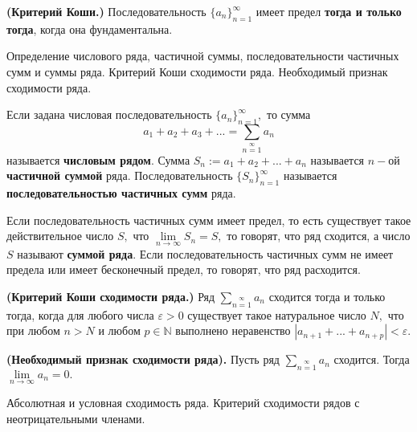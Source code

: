 \begin{theorem} \textbf{(Критерий Коши.)}
	Последовательность $\{a_n\}_{n=1}^{\infty}$
	имеет предел \textbf{тогда и только
		тогда}, когда она фундаментальна.
\end{theorem}


\newpage
\begin{problem}
Определение числового ряда, частичной суммы, последовательности частичных сумм
и суммы ряда. Критерий Коши сходимости ряда. Необходимый признак сходимости ряда.
\end{problem}

\begin{definition}
	Если задана числовая последовательность
	$\{a_n\}_{n=1}^{\infty},$ то сумма
	$$a_1+a_2+a_3+...=\sum\limits_{n=1}\limits^{\infty}a_n$$
	называется \textbf{числовым рядом}.
	Сумма $S_n:=a_1+a_2+...+a_n$
	называется $n-$ой \textbf{частичной суммой} ряда.
	Последовательность $\{S_n\}_{n=1}^{\infty}$
	называется \textbf{последовательностью частичных
		сумм} ряда.
\end{definition}

\begin{definition}
	Если последовательность частичных
	сумм имеет предел, то есть существует такое
	действительное число $S,$ что
	$\lim\limits_{n\rightarrow\infty}S_n=S,$
	то говорят, что ряд сходится, а
	число $S$ называют \textbf{суммой ряда}.
	Если последовательность частичных сумм
	не имеет предела или имеет бесконечный
	предел, то говорят, что ряд расходится.
\end{definition}

\begin{theorem} \textbf{(Критерий Коши сходимости ряда.)}
	Ряд $\sum\limits_{n=1}\limits^{\infty}a_n$ сходится тогда
	и только тогда, когда для любого числа $\varepsilon>0$
	существует такое натуральное число $N,$ что
	при любом $n>N$ и любом $p\in\mathbb{N}$
	выполнено неравенство $|a_{n+1}+...+a_{n+p}|<\varepsilon.$
\end{theorem}

\begin{lemma}\textbf{(Необходимый признак сходимости ряда).}
	Пусть ряд $\sum\limits_{n=1}\limits^{\infty}a_n$
	сходится. Тогда $\lim\limits_{n\rightarrow\infty}
		a_n=0.$
\end{lemma}

\newpage
\begin{problem}
Абсолютная и условная сходимость ряда. Критерий сходимости рядов с неотрицательными членами.
\end{problem}

